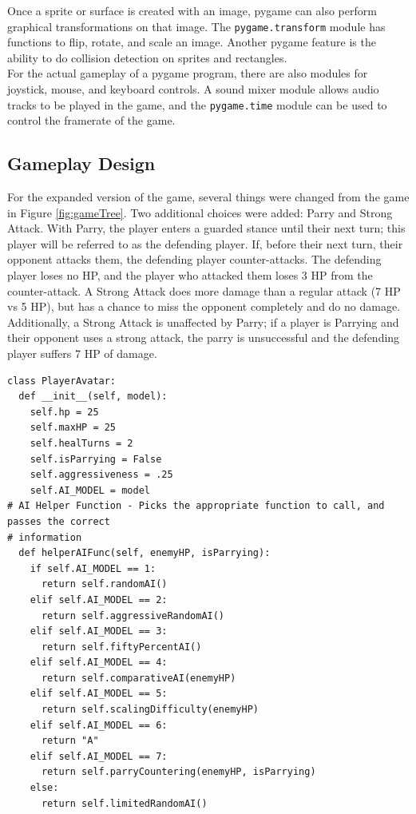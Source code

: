 Once a sprite or surface is created with an image, pygame can also perform graphical transformations on that image. The \texttt{pygame.transform} module has functions to flip, rotate, and scale an image. Another pygame feature is the ability to do collision detection on sprites and rectangles.\\

For the actual gameplay of a pygame program, there are also modules for joystick, mouse, and keyboard controls. A sound mixer module allows audio tracks to be played in the game, and the \texttt{pygame.time} module can be used to control the framerate of the game.
\newpage
\subsection{Gameplay Design}
For the expanded version of the game, several things were changed from the game in Figure \ref{fig:gameTree}. Two additional choices were added: Parry and Strong Attack. With Parry, the player enters a guarded stance until their next turn; this player will be referred to as the defending player. If, before their next turn, their opponent attacks them, the defending player counter-attacks. The defending player loses no HP, and the player who attacked them loses 3 HP from the counter-attack. A Strong Attack does more damage than a regular attack (7 HP vs 5 HP), but has a chance to miss the opponent completely and do no damage. Additionally, a Strong Attack is unaffected by Parry; if a player is Parrying and their opponent uses a strong attack, the parry is unsuccessful and the defending player suffers 7 HP of damage.

\begin{lstlisting}
class PlayerAvatar:
  def __init__(self, model):
    self.hp = 25
    self.maxHP = 25
    self.healTurns = 2
    self.isParrying = False
    self.aggressiveness = .25
    self.AI_MODEL = model
# AI Helper Function - Picks the appropriate function to call, and passes the correct
# information
  def helperAIFunc(self, enemyHP, isParrying):
    if self.AI_MODEL == 1:
      return self.randomAI()
    elif self.AI_MODEL == 2:
      return self.aggressiveRandomAI()
    elif self.AI_MODEL == 3:
      return self.fiftyPercentAI()
    elif self.AI_MODEL == 4:
      return self.comparativeAI(enemyHP)
    elif self.AI_MODEL == 5:
      return self.scalingDifficulty(enemyHP)
    elif self.AI_MODEL == 6:
      return "A"
    elif self.AI_MODEL == 7:
      return self.parryCountering(enemyHP, isParrying)
    else:
      return self.limitedRandomAI()
\end{lstlisting}

